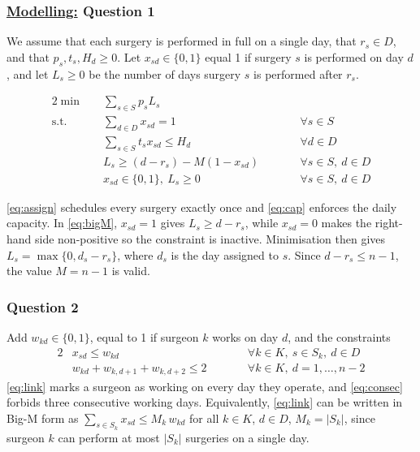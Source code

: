 
\subsubsection*{\underline{Modelling:} Question 1}

We assume that each surgery is performed in full on a single day, that
$r_s \in D$, and that $p_s, t_s, H_d \ge 0$. Let $x_{sd} \in \{0,1\}$ equal 1
if surgery $s$ is performed on day $d$, and let $L_s \ge 0$ be the number of
days surgery $s$ is performed after $r_s$.

\begin{alignat}{2}
\min \quad & \sum_{s \in S} p_s L_s && \label{eq:obj}\\
\text{s.t.} \quad
& \sum_{d \in D} x_{sd} = 1 && \qquad \forall s \in S \label{eq:assign}\\
& \sum_{s \in S} t_s x_{sd} \le H_d && \qquad \forall d \in D \label{eq:cap}\\
& L_s \ge (d - r_s) - M(1 - x_{sd}) && \qquad \forall s \in S,\ d \in D \label{eq:bigM}\\
& x_{sd} \in \{0,1\},\ L_s \ge 0 && \qquad \forall s \in S,\ d \in D \label{eq:dom1}
\end{alignat}

\eqref{eq:assign} schedules every surgery exactly once and \eqref{eq:cap}
enforces the daily capacity. In \eqref{eq:bigM}, $x_{sd}=1$ gives
$L_s \ge d - r_s$, while $x_{sd}=0$ makes the right-hand side non-positive so
the constraint is inactive. Minimisation then gives
$L_s = \max\{0, d_s - r_s\}$, where $d_s$ is the day assigned to $s$.
Since $d - r_s \le n - 1$, the value $M = n - 1$ is valid.

\subsubsection*{Question 2}

Add $w_{kd} \in \{0,1\}$, equal to 1 if surgeon $k$ works on day $d$, and the
constraints
\begin{alignat}{2}
& x_{sd} \le w_{kd} && \qquad \forall k \in K,\ s \in S_k,\ d \in D \label{eq:link}\\
& w_{kd} + w_{k,d+1} + w_{k,d+2} \le 2 && \qquad \forall k \in K,\ d = 1,\dots,n-2 \label{eq:consec}
\end{alignat}
\eqref{eq:link} marks a surgeon as working on every day they operate, and
\eqref{eq:consec} forbids three consecutive working days. Equivalently,
\eqref{eq:link} can be written in Big-M form as
$\sum_{s \in S_k} x_{sd} \le M_k\, w_{kd}$ for all $k \in K$, $d \in D$, $M_k=|S_k|$, since surgeon $k$ can perform at most $|S_k|$ surgeries on a single day.

